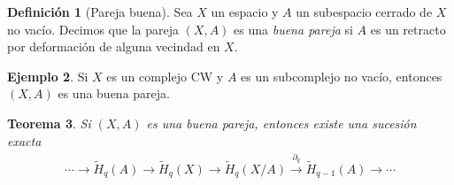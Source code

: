 \documentclass[11pt,a4paper]{article}
\theoremstyle{plain}
\newtheorem{theorem}{Teorema}[section]
\theoremstyle{definition}
\newtheorem{definition}[theorem]{Definición}
\newtheorem{example}[theorem]{Ejemplo}
\theoremstyle{remark}
\begin{document}
\begin{definition}[Pareja buena]
\label{def:pareja-buena}
Sea $X$ un espacio y $A$ un subespacio cerrado de $X$ no vacío. Decimos que
la pareja $(X,A)$ es una \emph{buena pareja} si $A$ es un retracto por
deformación de alguna vecindad en $X$.
\end{definition}

\begin{example}
\label{ex:cw-buena-pareja}
Si $X$ es un complejo CW y $A$ es un subcomplejo no vacío, entonces $(X,A)$
es una buena pareja.
\end{example}

\begin{theorem}
\label{thm:sucesion-pareja-buena}
Si $(X,A)$ es una buena pareja, entonces existe una sucesión exacta
\[
\cdots\to\tilde H_q(A)\to\tilde H_q(X)\to\tilde H_q(X/A)\xrightarrow{\hat\partial_q}\tilde H_{q-1}(A)\to\cdots
\]
\end{theorem}
\end{document}
